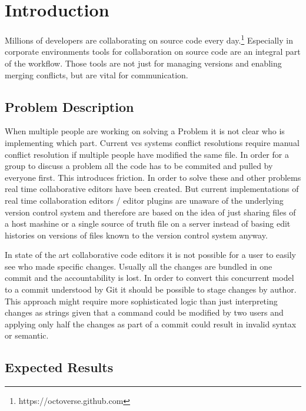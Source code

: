 \chapter{Introduction}
\label{sec:introduction}

Millions of developers are collaborating on source code every day.\footnote{https://octoverse.github.com}
Especially in corporate environments tools for collaboration on source code are an integral part of the workflow.
Those tools are not just for managing versions and enabling merging conflicts, but are vital for communication.

\section{Problem Description}

When multiple people are working on solving a Problem it is not clear who is implementing which part. Current vcs systems conflict resolutions require manual conflict resolution if multiple people have modified the same file.
In order for a group to discuss a problem all the code has to be commited and pulled by everyone first. This introduces friction. In order to solve these and other problems real time collaborative editors have been created.
But current implementations of real time collaboration editors / editor plugins are unaware of the underlying version control system and therefore are based on the idea of just sharing files of a host mashine or a single source of truth file on a server instead of basing edit histories on versions of files known to the version control system anyway.

In state of the art collaborative code editors it is not possible for a user to easily see who made specific changes. Usually all the changes are bundled in one commit and the accountability is lost. In order to convert this concurrent model to a commit understood by Git it should be possible to stage changes by author. This approach might require more sophisticated logic than just interpreting changes as strings given that a command could be modified by two users and applying only half the changes as part of a commit could result in invalid syntax or semantic.

\section{Expected Results}


